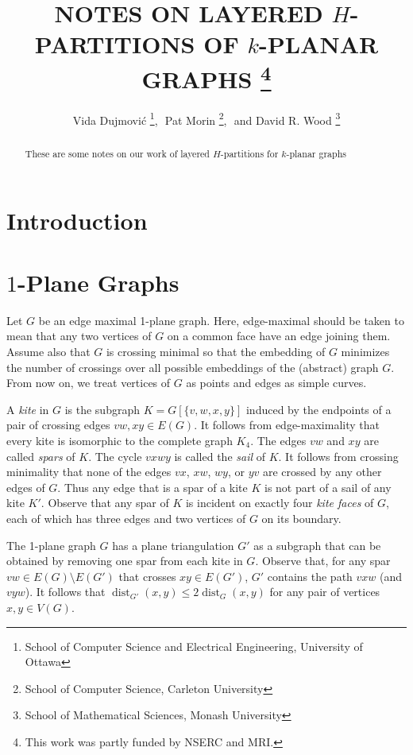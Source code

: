 \documentclass{patmorin}
\title{\MakeUppercase{Notes on Layered $H$-Partitions of $k$-Planar Graphs}%
    \thanks{This work was partly funded by NSERC and MRI.}}
\author{Vida Dujmovi\'c%
        \thanks{School of Computer Science and Electrical Engineering, 
                University of Ottawa},\,\, 
        Pat Morin%
        \thanks{School of Computer Science, Carleton University},\,\, and
        David R. Wood%
        \thanks{School of Mathematical Sciences, Monash University}}
\DeclareMathOperator{\dist}{dist}
\begin{document}
\maketitle


\begin{abstract}
  These are some notes on our work of layered $H$-partitions for $k$-planar graphs
\end{abstract}

\section{Introduction}

\section{$1$-Plane Graphs}

Let $G$ be an edge maximal 1-plane graph.  Here, edge-maximal should be taken to mean that any two vertices of $G$ on a common face have an edge joining them.  Assume also that $G$ is crossing minimal so that the embedding of $G$ minimizes the number of crossings over all possible embeddings of the (abstract) graph $G$.  From now on, we treat vertices of $G$ as points and edges as simple curves.

A \emph{kite} in $G$ is the subgraph $K=G[\{v,w,x,y\}]$ induced by the endpoints of a pair of crossing edges $vw,xy\in E(G)$.  It follows from edge-maximality that every kite is isomorphic to the complete graph $K_4$.
The edges $vw$ and $xy$ are called \emph{spars} of $K$.  The cycle $vxwy$ is called the \emph{sail} of $K$.  It follows from crossing minimality that none of the edges $vx$, $xw$, $wy$, or $yv$ are crossed by any other edges of $G$. Thus any edge that is a spar of a kite $K$ is not part of a sail of any kite $K'$. Observe that any spar of $K$ is incident on exactly four \emph{kite faces} of $G$, each of which has three edges and two vertices of $G$ on its boundary.

The 1-plane graph $G$ has a plane triangulation $G'$ as a subgraph that can be obtained by removing one spar from each kite in $G$.  Observe that, for any spar $vw\in E(G)\setminus E(G')$ that crosses $xy\in E(G')$, $G'$ contains the path $vxw$ (and $vyw$).  It follows that $\dist_{G'}(x,y)\le 2\dist_G(x,y)$ for any pair of vertices $x,y\in V(G)$.
\end{document}
